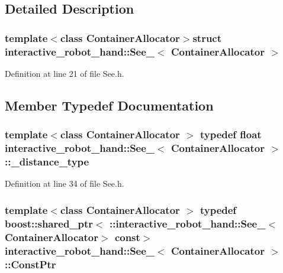 \subsection{Detailed Description}
\subsubsection*{template$<$class Container\-Allocator$>$struct interactive\-\_\-robot\-\_\-hand\-::\-See\-\_\-$<$ Container\-Allocator $>$}



Definition at line 21 of file See.\-h.



\subsection{Member Typedef Documentation}
\subsubsection[{\-\_\-distance\-\_\-type}]{\setlength{\rightskip}{0pt plus 5cm}template$<$class Container\-Allocator $>$ typedef float {\bf interactive\-\_\-robot\-\_\-hand\-::\-See\-\_\-}$<$ Container\-Allocator $>$\-::{\bf \-\_\-distance\-\_\-type}}\label{structinteractive__robot__hand_1_1See___ad554ef3992585edbf1344f2e5ab00ddd}


Definition at line 34 of file See.\-h.

\subsubsection[{Const\-Ptr}]{\setlength{\rightskip}{0pt plus 5cm}template$<$class Container\-Allocator $>$ typedef boost\-::shared\-\_\-ptr$<$ \-::{\bf interactive\-\_\-robot\-\_\-hand\-::\-See\-\_\-}$<$Container\-Allocator$>$ const$>$ {\bf interactive\-\_\-robot\-\_\-hand\-::\-See\-\_\-}$<$ Container\-Allocator $>$\-::{\bf Const\-Ptr}}\label{structinteractive__robot__hand_1_1See___a76e2d1ef1bc8088f4724ea85b5e1247d}


